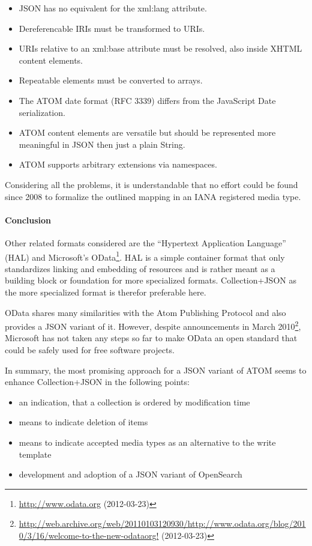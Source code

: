 \documentclass[11pt,a4paper,headsepline,twoside]{scrartcl}		%
\newcommand{\citeurl}[2]{\url{#1} (#2)}
\begin{document}
\begin{itemize}
  \item JSON has no equivalent for the xml:lang attribute.
  \item Dereferencable IRIs must be transformed to URIs.
  \item URIs relative to an xml:base attribute must be resolved, also inside XHTML content elements.
  \item Repeatable elements must be converted to arrays.
  \item The ATOM date format (RFC 3339) differs from the JavaScript Date serialization.
  \item ATOM content elements are versatile but should be represented more meaningful in JSON then just a plain String.
  \item ATOM supports arbitrary extensions via namespaces.
\end{itemize}

Considering all the problems, it is understandable that no effort could be found
since 2008 to formalize the outlined mapping in an IANA registered media type.

\paragraph{Conclusion}

Other related formats considered are the ``Hypertext Application Language''
(HAL) \cite{Kelly2011} and Microsoft's
OData\footnote{\citeurl{http://www.odata.org}{2012-03-23}}. HAL is a simple
container format that only standardizes linking and embedding of resources and
is rather meant as a building block or foundation for more specialized
formats. Collection+JSON as the more specialized format is therefor preferable
here.

OData shares many similarities with the Atom Publishing Protocol and also
provides a JSON variant of it. However, despite announcements in March
2010\footnote{\citeurl{http://web.archive.org/web/20110103120930/http://www.odata.org/blog/2010/3/16/welcome-to-the-new-odataorg!}{2012-03-23}},
Microsoft has not taken any steps so far to make OData an open standard that
could be safely used for free software projects.

In summary, the most promising approach for a JSON variant of ATOM seems to
enhance Collection+JSON in the following points:

\begin{itemize}
\item an indication, that a collection is ordered by modification time
\item means to indicate deletion of items
\item means to indicate accepted media types as an alternative to the write
  template
\item development and adoption of a JSON variant of OpenSearch
\end{itemize}
\end{document}

